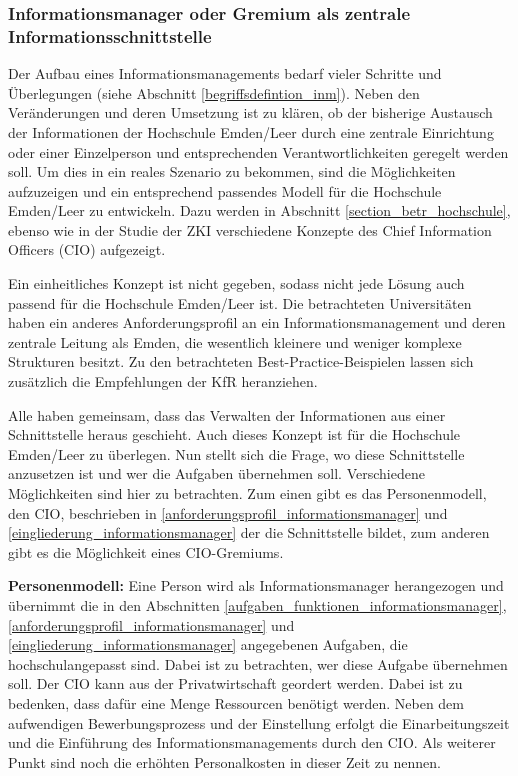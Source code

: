 \subsubsection{Informationsmanager oder Gremium als zentrale Informationsschnittstelle}
\label{subsubsection_cio_gremium}

Der Aufbau eines Informationsmanagements bedarf vieler Schritte und Überlegungen (siehe Abschnitt \ref{begriffsdefintion_inm}). Neben den Veränderungen und deren Umsetzung ist zu klären, ob der bisherige Austausch der Informationen der Hochschule Emden/Leer durch eine zentrale Einrichtung oder einer Einzelperson und entsprechenden Verantwortlichkeiten geregelt werden soll. Um dies in ein reales Szenario zu bekommen, sind die Möglichkeiten aufzuzeigen und ein entsprechend passendes Modell für die Hochschule Emden/Leer zu entwickeln. Dazu werden in Abschnitt  \ref{section_betr_hochschule}, ebenso wie in der Studie der ZKI verschiedene Konzepte des Chief Information Officers (CIO) aufgezeigt. 

Ein einheitliches Konzept ist nicht gegeben, sodass nicht jede Lösung auch passend für die Hochschule Emden/Leer ist. Die betrachteten Universitäten haben ein anderes Anforderungsprofil an ein Informationsmanagement und deren zentrale Leitung als Emden, die wesentlich kleinere und weniger komplexe Strukturen besitzt. Zu den betrachteten Best-Practice-Beispielen lassen sich zusätzlich die Empfehlungen der KfR heranziehen. 

Alle haben gemeinsam, dass das Verwalten der Informationen aus einer Schnittstelle heraus geschieht. Auch dieses Konzept ist für die Hochschule Emden/Leer zu überlegen. Nun stellt sich die Frage, wo diese Schnittstelle anzusetzen ist und wer die Aufgaben übernehmen soll. Verschiedene Möglichkeiten sind hier zu betrachten. Zum einen gibt es das Personenmodell, den CIO, beschrieben in \ref{anforderungsprofil_informationsmanager} und \ref{eingliederung_informationsmanager} der die Schnittstelle bildet, zum anderen gibt es die Möglichkeit eines CIO-Gremiums. 


\textbf{Personenmodell:\newline}
Eine Person wird als Informationsmanager herangezogen und übernimmt die in den Abschnitten \ref{aufgaben_funktionen_informationsmanager},\ref{anforderungsprofil_informationsmanager} und \ref{eingliederung_informationsmanager} angegebenen Aufgaben, die hochschulangepasst sind. Dabei ist zu betrachten, wer diese Aufgabe übernehmen soll. Der CIO kann aus der Privatwirtschaft geordert werden. Dabei ist zu bedenken, dass dafür eine Menge Ressourcen benötigt werden. Neben dem aufwendigen Bewerbungsprozess und der Einstellung erfolgt die Einarbeitungszeit und die Einführung des Informationsmanagements durch den CIO. Als weiterer Punkt sind noch die erhöhten Personalkosten in dieser Zeit zu nennen.

